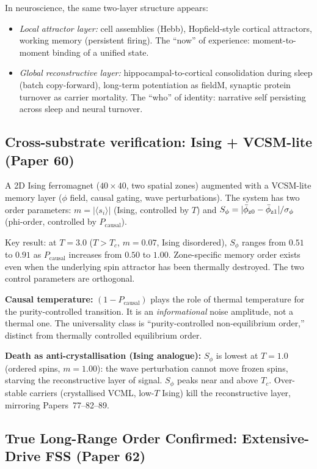 \documentclass[11pt]{article}
\begin{document}
In neuroscience, the same two-layer structure appears:
\begin{itemize}
  \item \emph{Local attractor layer:} cell assemblies (Hebb), Hopfield-style
    cortical attractors, working memory (persistent firing).
    The ``now'' of experience: moment-to-moment binding of a unified state.
  \item \emph{Global reconstructive layer:} hippocampal-to-cortical consolidation
    during sleep (batch copy-forward), long-term potentiation as fieldM,
    synaptic protein turnover as carrier mortality.
    The ``who'' of identity: narrative self persisting across sleep and
    neural turnover.
\end{itemize}

\subsection{Cross-substrate verification: Ising + VCSM-lite (Paper 60)}

A 2D Ising ferromagnet ($40 \times 40$, two spatial zones) augmented with a
VCSM-lite memory layer ($\phi$ field, causal gating, wave perturbations).
The system has two order parameters:
$m = |\langle s_i \rangle|$ (Ising, controlled by $T$) and
$S_\phi = |\bar\phi_{\rm z0}-\bar\phi_{\rm z1}|/\sigma_\phi$
(phi-order, controlled by $P_\mathrm{causal}$).

Key result: at $T=3.0$ ($T > T_c$, $m=0.07$, Ising disordered),
$S_\phi$ ranges from $0.51$ to $0.91$ as $P_\mathrm{causal}$
increases from $0.50$ to $1.00$.
Zone-specific memory order exists even when the underlying spin attractor has
been thermally destroyed.
The two control parameters are orthogonal.

\textbf{Causal temperature:} $(1-P_\mathrm{causal})$ plays the role of
thermal temperature for the purity-controlled transition.
It is an \emph{informational} noise amplitude, not a thermal one.
The universality class is ``purity-controlled non-equilibrium order,''
distinct from thermally controlled equilibrium order.

\textbf{Death as anti-crystallisation (Ising analogue):}
$S_\phi$ is lowest at $T=1.0$ (ordered spins, $m=1.00$): the wave
perturbation cannot move frozen spins, starving the reconstructive layer of
signal.
$S_\phi$ peaks near and above $T_c$.
Over-stable carriers (crystallised VCML, low-$T$ Ising) kill the reconstructive
layer, mirroring Papers~77--82--89.

\subsection{True Long-Range Order Confirmed: Extensive-Drive FSS (Paper 62)}
\end{document}
